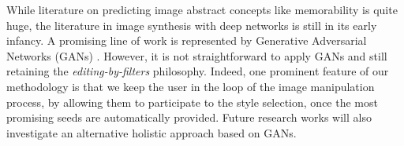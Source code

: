 \documentclass{sig-alternate-05-2015}
\begin{document}
While literature on predicting image abstract concepts like memorability is quite huge, the literature in image synthesis with deep networks is still in its early infancy.
A promising line of work is represented by Generative Adversarial Networks (GANs) \cite{goodfellow2014generative}. %
However, it is not straightforward to apply GANs and still retaining the \emph{editing-by-filters} philosophy. Indeed, one prominent feature of our methodology is that we keep the user in the loop of the image manipulation process, %
by allowing them to participate to the style selection, once the most promising seeds are automatically provided. 
Future research works will also investigate an alternative holistic approach based on GANs.








\end{document}
